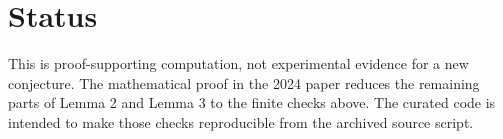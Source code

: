 \documentclass{article}
\begin{document}
\section{Status}

This is proof-supporting computation, not experimental evidence for a new
conjecture.  The mathematical proof in the 2024 paper reduces the remaining
parts of Lemma 2 and Lemma 3 to the finite checks above.  The curated code is
intended to make those checks reproducible from the archived source script.
\end{document}
